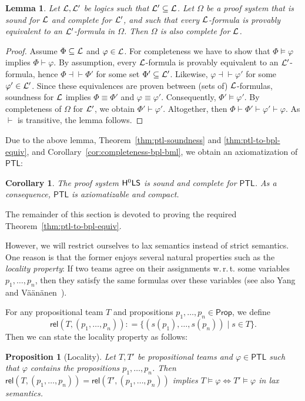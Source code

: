 \documentclass[a4paper,english,fleqn,11pt,final]{scrartcl}
\makeatletter
\newcommand{\wrt}{w.\,r.\,t.\@\xspace}
\newcommand{\logic}[1]{\ensuremath{\mathsf{#1}}\xspace}
\newcommand{\PS}{\logic{Prop}}
\newcommand{\PTL}{\logic{PTL}}
\newcommand{\calL}{\protect\ensuremath{\mathcal{L}}}
\newcommand{\sfS}{\protect\ensuremath{\mathsf{S}}}
\newcommand{\sfH}{\protect\ensuremath{\mathsf{H}}}
\newcommand{\sfL}{\protect\ensuremath{\mathsf{L}}}
\providecommand{\dfn}{\mathrel{\mathop:}=}
\newcommand{\eqpr}{\dashv\vdash}
\newcommand{\rel}{\mathsf{rel}}
\theoremstyle{plain}
\newtheorem{proposition}[theorem]{Proposition}
\newtheorem{lemma}[theorem]{Lemma}
\newtheorem{corollary}[theorem]{Corollary}
\theoremstyle{definition}
\makeatother
\begin{document}
\begin{lemma}\label{lem:translate-completeness}
Let $\calL,\calL'$ be logics such that $\calL' \subseteq \calL$.
Let $\Omega$ be a proof system that is sound for $\calL$ and complete for $\calL'$, and such that every $\calL$-formula is provably equivalent to an $\calL'$-formula in $\Omega$.
Then $\Omega$ is also complete for $\calL$.
\end{lemma}
\begin{proof}
Assume $\Phi \subseteq \calL$ and $\varphi \in \calL$.
For completeness we have to show that $\Phi \vDash \varphi$ implies $\Phi \vdash \varphi$.
By assumption, every $\calL$-formula is provably equivalent to an $\calL'$-formula, hence $\Phi \eqpr \Phi'$ for some set $\Phi' \subseteq \calL'$.
Likewise, $\varphi \eqpr \varphi'$ for some $\varphi' \in \calL'$.
Since these equivalences are proven between (sets of) $\calL$-formulas, soundness for $\calL$ implies $\Phi \equiv \Phi'$ and $\varphi \equiv \varphi'$.
Consequently, $\Phi' \vDash \varphi'$.
By completeness of $\Omega$ for $\calL'$, we obtain $\Phi' \vdash \varphi'$.
Altogether, then $\Phi \vdash \Phi' \vdash \varphi' \vdash \varphi$.
As $\vdash$ is transitive, the lemma follows.
\end{proof}

Due to the above lemma, Theorem~\ref{thm:ptl-soundness} and \ref{thm:ptl-to-bpl-equiv}, and Corollary~\ref{cor:completeness-bpl-bml}, we obtain an axiomatization of $\PTL$:

\begin{corollary}\label{cor:ptl-completeness}
The proof system $\sfH^0\sfL\sfS$ is sound and complete for $\PTL$.
As a consequence, $\PTL$ is axiomatizable and compact.
\end{corollary}

The remainder of this section is devoted to proving the required Theorem~\ref{thm:ptl-to-bpl-equiv}.

However, we will restrict ourselves to lax semantics instead of strict semantics.
One reason is that the former enjoys several natural properties such as the \emph{locality property}: If two teams agree on their assignments \wrt some variables $p_1, \ldots, p_n$, then they satisfy the same formulas over these variables (see also Yang and Väänänen~\cite{yang_propositional_2017}).

For any propositional team $T$ and propositions $p_1,\ldots,p_n \in \PS$, we define
\[
\rel(T, (p_1,\ldots,p_n)) \dfn \{ (s(p_1),\ldots,s(p_n)) \mid s \in T \}\text{.}
\]
Then we can state the locality property as follows:
\begin{proposition}[Locality]\label{prop:locality}
Let $T,T'$ be propositional teams and $\varphi \in \PTL$ such that $\varphi$ contains the propositions $p_1, \ldots, p_n$.
Then $\rel(T,(p_1,\ldots,p_n)) = \rel(T',(p_1,\ldots,p_n))$ implies $T \vDash \varphi \Leftrightarrow T' \vDash \varphi$ in lax semantics.
\end{proposition}
\end{document}
